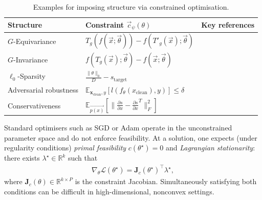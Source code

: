 \begin{table}[t]
  \caption{Examples for imposing structure via constrained optimisation.
}
  \label{table-structure-learning-examples}
\begin{center}
    \small
    \begin{tabular}{p{} p{} p{}}
    \toprule
    Structure 
        & Constraint $\vec{c}_\psi(\theta)$ 
        & Key references 
        \\
    \midrule 
    $G$-Equivariance 
        & $T_g(f(\vec{x}; \vec{\theta})) - f(T'_g(\vec{x}); \vec{\theta})$ 
        & \citet{cohen2016group, finzi2021practical}
        \\
    $G$-Invariance 
        & $f(T_g(\vec{x}); \vec{\theta}) - f(\vec{x}; \vec{\theta})$ & \citet{puny2021frame}
    \\ 
    $\ell_0$-Sparsity 
        & $\frac{\| \theta\|_0}{D} - s_{\textrm{target}}$  
        & \citet{louizos2017learning, gallego2022controlled} 
        \\ 
    Adversarial robustness 
        & $\mathbb{E}_{\mathbf{x}_{\textrm{clean}}, y}[l(f_\theta({x}_{\textrm{clean}}), y)] \leq \delta$ 
        & \citet{robey2021adversarial} 
        \\ 
    Conservativeness 
            & $\mathbb{E}_{\vec{p(x)}}[\|\frac{\partial s}{\partial x} - \frac{\partial s}{\partial x}^T\|_F^2]$ 
        & \citet{chao2022investigating} 
        \\ 
    \bottomrule
  \end{tabular}
  \end{center}
\end{table}
Standard optimisers such as SGD or Adam \citep{kingma2014adam} operate in the unconstrained parameter space and do not enforce feasibility.
At a solution, one expects (under regularity conditions) \emph{primal feasibility} $c(\theta^\star)=0$ and \emph{Lagrangian stationarity}:
there exists $\lambda^\star\in\mathbb{R}^k$ such that
\begin{align}
\label{eq:kkt_stationarity}
\nabla_\theta \mathcal{L}(\theta^\star)=\mathbf{J}_c(\theta^\star)^\top \lambda^\star,
\end{align}
where $\mathbf{J}_c(\theta)\in\mathbb{R}^{k\times P}$ is the constraint Jacobian. Simultaneously satisfying both conditions can be difficult in high-dimensional, nonconvex settings. 


